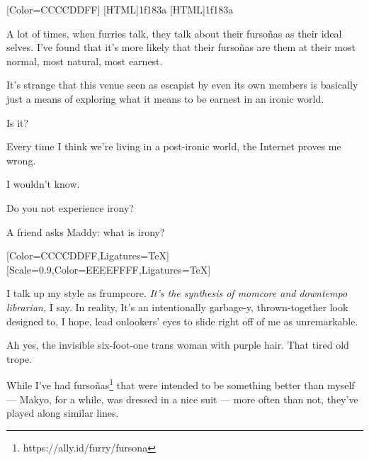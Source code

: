 \label{furry:furry}
\renewfontfamily{}[Color=CCCCDDFF]
[HTML]{1f183a}
[HTML]{1f183a}
\begin{paracol}{2}
  \begin{leftcolumn}

\noindent A lot of times, when furries talk, they talk about their fursoñas as their ideal selves. I've found that it's more likely that their fursoñas are them at their most normal, most natural, most earnest.

It's strange that this venue seen as escapist by even its own members is basically just a means of exploring what it means to be earnest in an ironic world.

\begin{ally}
Is it?
\end{ally}
Every time I think we're living in a post-ironic world, the Internet proves me wrong.

\begin{ally}
I wouldn't know.
\end{ally}
Do you not experience irony?

\begin{ally}
A friend asks Maddy: what is irony?
\end{ally}
\end{leftcolumn}
\begin{rightcolumn}
  [Color=CCCCDDFF,Ligatures=TeX]
  \renewfontfamily{}[Scale=0.9,Color=EEEEFFFF,Ligatures=TeX]
  \null
  \vspace{12.7\baselineskip}
  
\end{rightcolumn}
\begin{leftcolumn}
\newpage

\noindent I talk up my style as frumpcore. \emph{It's the synthesis of momcore and downtempo librarian,} I say. In reality, It's an intentionally garbage-y, thrown-together look designed to, I hope, lead onlookers' eyes to slide right off of me as unremarkable.

\begin{ally}
Ah yes, the invisible six-foot-one trans woman with purple hair. That tired old trope.
\end{ally}
While I've had fursoñas\footnote{https://ally.id/furry/fursona} that were intended to be something better than myself --- Makyo, for a while, was dressed in a nice suit --- more often than not, they've played along similar lines.


\end{leftcolumn}
\end{paracol}
